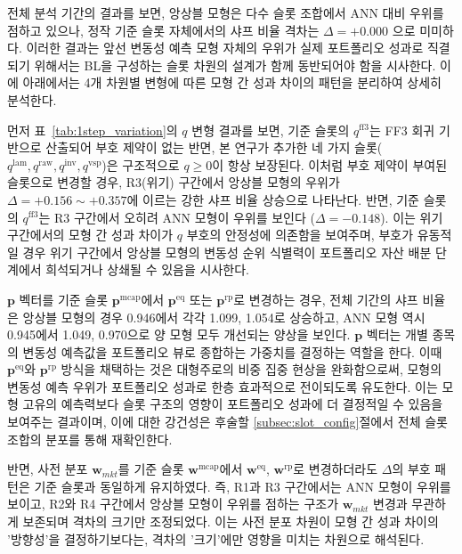 \documentclass{article}
\begin{document}
전체 분석 기간의 결과를 보면, 앙상블 모형은 다수 슬롯 조합에서 ANN 대비 우위를 점하고 있으나, 정작 기준 슬롯 자체에서의 샤프 비율 격차는 $\Delta = +0.000$ 으로 미미하다. 이러한 결과는 앞선 변동성 예측 모형 자체의 우위가 실제 포트폴리오 성과로 직결되기 위해서는 BL을 구성하는 슬롯 차원의 설계가 함께 동반되어야 함을 시사한다. 이에 아래에서는 4개 차원별 변형에 따른 모형 간 성과 차이의 패턴을 분리하여 상세히 분석한다.

먼저 표~\ref{tab:1step_variation}의 $q$ 변형 결과를 보면, 기준 슬롯의 $q^{\mathrm{ff3}}$는 FF3 회귀 기반으로 산출되어 부호 제약이 없는 반면, 본 연구가 추가한 네 가지 슬롯($q^{\mathrm{lam}}, q^{\mathrm{raw}}, q^{\mathrm{inv}}, q^{\mathrm{vsp}}$)은 구조적으로 $q \geq 0$이 항상 보장된다. 이처럼 부호 제약이 부여된 슬롯으로 변경할 경우, R3(위기) 구간에서 앙상블 모형의 우위가 $\Delta = +0.156 \sim +0.357$에 이르는 강한 샤프 비율 상승으로 나타난다. 반면, 기준 슬롯의 $q^{\mathrm{ff3}}$는 R3 구간에서 오히려 ANN 모형이 우위를 보인다 ($\Delta = -0.148$). 이는 위기 구간에서의 모형 간 성과 차이가 $q$ 부호의 안정성에 의존함을 보여주며, 부호가 유동적일 경우 위기 구간에서 앙상블 모형의 변동성 순위 식별력이 포트폴리오 자산 배분 단계에서 희석되거나 상쇄될 수 있음을 시사한다.

$\mathbf{p}$ 벡터를 기준 슬롯 $\mathbf{p}^{\mathrm{mcap}}$에서 $\mathbf{p}^{\mathrm{eq}}$ 또는 $\mathbf{p}^{\mathrm{rp}}$로 변경하는 경우, 전체 기간의 샤프 비율은 앙상블 모형의 경우 0.946에서 각각 1.099, 1.054로 상승하고, ANN 모형 역시 0.945에서 1.049, 0.970으로 양 모형 모두 개선되는 양상을 보인다. $\mathbf{p}$ 벡터는 개별 종목의 변동성 예측값을 포트폴리오 뷰로 종합하는 가중치를 결정하는 역할을 한다. 이때 $\mathbf{p}^{\mathrm{eq}}$와 $\mathbf{p}^{\mathrm{rp}}$ 방식을 채택하는 것은 대형주로의 비중 집중 현상을 완화함으로써, 모형의 변동성 예측 우위가 포트폴리오 성과로 한층 효과적으로 전이되도록 유도한다. 이는 모형 고유의 예측력보다 슬롯 구조의 영향이 포트폴리오 성과에 더 결정적일 수 있음을 보여주는 결과이며, 이에 대한 강건성은 후술할  \ref{subsec:slot_config}절에서 전체 슬롯 조합의 분포를 통해 재확인한다. 

반면, 사전 분포 $\mathbf{w}_{mkt}$를 기준 슬롯 $\mathbf{w}^{\mathrm{mcap}}$에서 $\mathbf{w}^{\mathrm{eq}}$, $\mathbf{w}^{\mathrm{rp}}$로 변경하더라도 $\Delta$의 부호 패턴은 기준 슬롯과 동일하게 유지하였다. 즉, R1과 R3 구간에서는 ANN 모형이 우위를 보이고, R2와 R4 구간에서 앙상블 모형이 우위를 점하는 구조가 $\mathbf{w}_{mkt}$ 변경과 무관하게 보존되며 격차의 크기만 조정되었다. 이는 사전 분포 차원이 모형 간 성과 차이의 '방향성'을 결정하기보다는, 격차의 '크기'에만 영향을 미치는 차원으로 해석된다.
\end{document}
